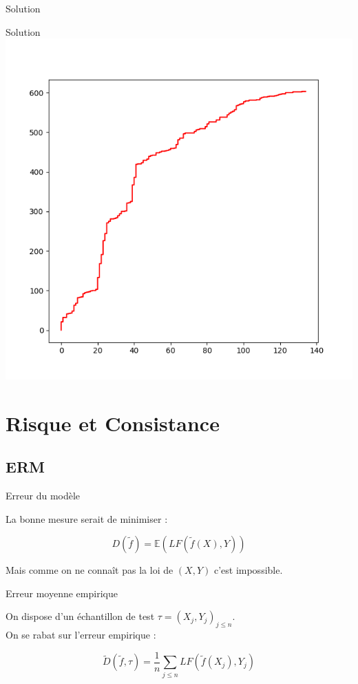 \documentclass[11pt]{beamer}
\newcommand{\Pythonsmall}[1]{
	{\scriptsize }
}
\begin{document}
\begin{frame}{Solution}
\Pythonsmall{ext5}
\end{frame}

\begin{frame}{Solution}
\includegraphics[scale=0.45]{ext5}
\end{frame}


\section{Risque et Consistance}

\subsection{ERM}

\begin{frame}{Erreur du modèle}

La bonne mesure serait de minimiser :

$$D(\tilde{f}) = \mathbb{E}(LF(\tilde{f}(X),Y))$$

Mais comme on ne connaît pas la loi de $(X,Y)$ c'est impossible.

\end{frame}


\begin{frame}{Erreur moyenne empirique}

On dispose d'un échantillon de test $\tau = (X_j,Y_j)_{j\leq n}$.\\

On se rabat sur l'erreur empirique :

$$\tilde{D}(\tilde{f},\tau) = \frac{1}{n}\sum_{j \leq n} LF(\tilde{f}(X_j),Y_j)$$


\end{frame}
\end{document}

